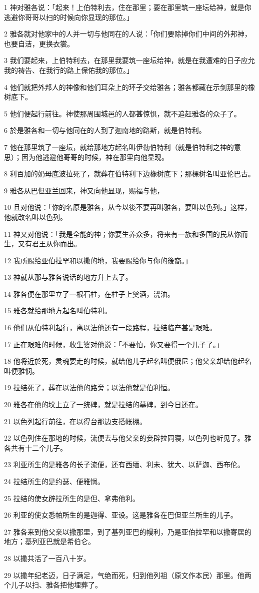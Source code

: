 \par 1 神对雅各说：「起来！上伯特利去，住在那里；要在那里筑一座坛给神，就是你逃避你哥哥以扫的时候向你显现的那位。」
\par 2 雅各就对他家中的人并一切与他同在的人说：「你们要除掉你们中间的外邦神，也要自洁，更换衣裳。
\par 3 我们要起来，上伯特利去，在那里我要筑一座坛给神，就是在我遭难的日子应允我的祷告、在我行的路上保佑我的那位。」
\par 4 他们就把外邦人的神像和他们耳朵上的环子交给雅各；雅各都藏在示剑那里的橡树底下。
\par 5 他们便起行前往。神使那周围城邑的人都甚惊惧，就不追赶雅各的众子了。
\par 6 於是雅各和一切与他同在的人到了迦南地的路斯，就是伯特利。
\par 7 他在那里筑了一座坛，就给那地方起名叫伊勒伯特利（就是伯特利之神的意思）；因为他逃避他哥哥的时候，神在那里向他显现。
\par 8 利百加的奶母底波拉死了，就葬在伯特利下边橡树底下；那棵树名叫亚伦巴古。
\par 9 雅各从巴但亚兰回来，神又向他显现，赐福与他，
\par 10 且对他说：「你的名原是雅各，从今以後不要再叫雅各，要叫以色列。」这样，他就改名叫以色列。
\par 11 神又对他说：「我是全能的神；你要生养众多，将来有一族和多国的民从你而生，又有君王从你而出。
\par 12 我所赐给亚伯拉罕和以撒的地，我要赐给你与你的後裔。」
\par 13 神就从那与雅各说话的地方升上去了。
\par 14 雅各便在那里立了一根石柱，在柱子上奠酒，浇油。
\par 15 雅各就给那地方起名叫伯特利。
\par 16 他们从伯特利起行，离以法他还有一段路程，拉结临产甚是艰难。
\par 17 正在艰难的时候，收生婆对他说：「不要怕，你又要得一个儿子了。」
\par 18 他将近於死，灵魂要走的时候，就给他儿子起名叫便俄尼；他父亲却给他起名叫便雅悯。
\par 19 拉结死了，葬在以法他的路旁；以法他就是伯利恒。
\par 20 雅各在他的坟上立了一统碑，就是拉结的墓碑，到今日还在。
\par 21 以色列起行前往，在以得台那边支搭帐棚。
\par 22 以色列住在那地的时候，流便去与他父亲的妾辟拉同寝，以色列也听见了。雅各共有十二个儿子。
\par 23 利亚所生的是雅各的长子流便，还有西缅、利未、犹大、以萨迦、西布伦。
\par 24 拉结所生的是约瑟、便雅悯。
\par 25 拉结的使女辟拉所生的是但、拿弗他利。
\par 26 利亚的使女悉帕所生的是迦得、亚设。这是雅各在巴但亚兰所生的儿子。
\par 27 雅各来到他父亲以撒那里，到了基列亚巴的幔利，乃是亚伯拉罕和以撒寄居的地方；基列亚巴就是希伯仑。
\par 28 以撒共活了一百八十岁。
\par 29 以撒年纪老迈，日子满足，气绝而死，归到他列祖（原文作本民）那里。他两个儿子以扫、雅各把他埋葬了。

